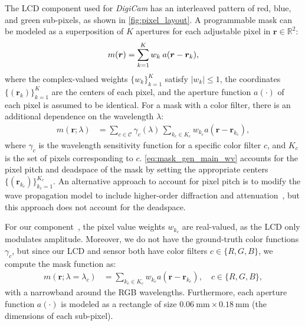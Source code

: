 \noindent The LCD component used for \textit{DigiCam} has an interleaved pattern of red, blue, and green sub-pixels, 
as shown in \cref{fig:pixel_layout}.
A programmable mask can be modeled as a superposition of $K$ apertures for each adjustable pixel in $ \bm{r} \in \mathbb{R}^2 $:
\begin{align}
	\label{eq:mask_gen_main}
	m(\bm{r}) = \sum_{k=1}^K w_{k} \hspace{0.08cm} a(\bm{r} - \bm{r}_k),
\end{align}
where the complex-valued weights $\{w_{k}\}_{k=1}^K$ satisfy $|w_{k}| \leq 1$, the coordinates $ \{(\bm{r}_k)\}_{k=1}^{K} $ are the centers of each pixel, and the aperture function $a(\cdot)$ of each pixel is assumed to be identical. 
For a mask with a color filter, there is an additional dependence on the wavelength $\lambda$:
\begin{align}
	\label{eq:mask_gen_main_wv}
	m(\bm{r}; \lambda) &= \sum_{c\in\mathcal{C}} \gamma_c(\lambda)  \, \sum_{k_c \in K_c}
	w_{k_c}
	a(\bm{r} -\bm{r}_{k_c}),
\end{align}
where $\gamma_c$ is the wavelength sensitivity function for a specific color filter $c$, and $K_c$ is the set of pixels corresponding to $c$. 
\cref{eq:mask_gen_main_wv} accounts for the pixel pitch and deadspace of the mask by setting the appropriate centers $ \{(\bm{r}_{k_c})\}_{k_c=1}^{K_c} $.
An alternative approach to account for pixel pitch is to modify the wave propagation model to include higher-order diffraction and attenuation~\cite{Gopakumar:21}, but this approach does not account for the deadspace.

For our component~\cite{adafruitlcd}, the pixel value weights $w_{k_c}$ are real-valued, as the LCD only modulates amplitude.
Moreover, we do not have the ground-truth color functions $\gamma_c$, but since our LCD and sensor both have color filters $ c\in\{R,G,B\} $, we compute the mask function as:
\begin{align}
	\label{eq:mask_simple_app}
	m(\bm{r}; \lambda=\lambda_c) &= \sum_{k_c \in K_c}
	w_{k_c}
	a(\bm{r} -\bm{r}_{k_c}), \quad c\in\{R,G,B\},
\end{align}
with a narrowband around the RGB wavelengths. 
Furthermore, each aperture function $a(\cdot)$ is modeled as a rectangle of size $\SI{0.06}{\milli\meter}\times\SI{0.18}{\milli\meter}$ (the dimensions of each sub-pixel).


